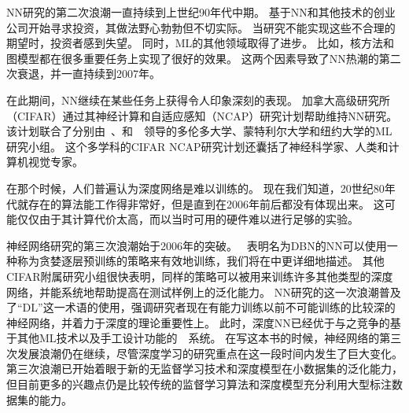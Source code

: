 \gls{NN}研究的第二次浪潮一直持续到上世纪90年代中期。
基于\gls{NN}和其他技术的创业公司开始寻求投资，其做法野心勃勃但不切实际。
当研究不能实现这些不合理的期望时，投资者感到失望。
同时，\gls{ML}的其他领域取得了进步。
比如，核方法\citep{Boser92,Cortes95,SchBurSmo99}和图模型\citep{Jordan98}都在很多重要任务上实现了很好的效果。
这两个因素导致了\gls{NN}热潮的第二次衰退，并一直持续到2007年。

在此期间，\gls{NN}继续在某些任务上获得令人印象深刻的表现\citep{LeCun98-small,Bengio-nnlm2001}。
加拿大高级研究所（CIFAR）通过其神经计算和自适应感知（NCAP）研究计划帮助维持\gls{NN}研究。
该计划联合了分别由~、和~~领导的多伦多大学、蒙特利尔大学和纽约大学的\gls{ML}研究小组。
这个多学科的CIFAR NCAP研究计划还囊括了神经科学家、人类和计算机视觉专家。


在那个时候，人们普遍认为深度网络是难以训练的。
现在我们知道，20世纪80年代就存在的算法能工作得非常好，但是直到在2006年前后都没有体现出来。
这可能仅仅由于其计算代价太高，而以当时可用的硬件难以进行足够的实验。

神经网络研究的第三次浪潮始于2006年的突破。
~表明名为\gls{DBN}的\gls{NN}可以使用一种称为贪婪逐层预训练的策略来有效地训练\citep{Hinton06}，我们将在中更详细地描述。
其他CIFAR附属研究小组很快表明，同样的策略可以被用来训练许多其他类型的深度网络\citep{Bengio+Lecun-chapter2007-small,ranzato-07}，并能系统地帮助提高在测试样例上的泛化能力。
\gls{NN}研究的这一次浪潮普及了``\gls{DL}''这一术语的使用，强调研究者现在有能力训练以前不可能训练的比较深的神经网络，并着力于深度的理论重要性上\citep{Bengio+Lecun-chapter2007,Delalleau+Bengio-2011-small,Pascanu-et-al-ICLR2014,Montufar-et-al-NIPS2014}。
此时，深度\gls{NN}已经优于与之竞争的基于其他\gls{ML}技术以及手工设计功能的~~系统。
在写这本书的时候，神经网络的第三次发展浪潮仍在继续，尽管深度学习的研究重点在这一段时间内发生了巨大变化。
第三次浪潮已开始着眼于新的无监督学习技术和深度模型在小数据集的泛化能力，但目前更多的兴趣点仍是比较传统的监督学习算法和深度模型充分利用大型标注数据集的能力。

